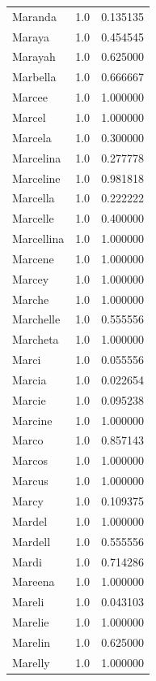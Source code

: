 \documentclass[
  letterpaper,
  DIV=11,
  numbers=noendperiod]{scrreprt}
\begin{document}
\begin{tabular}{lrr}
Maranda         &   1.0 &   0.135135 \\
Maraya          &   1.0 &   0.454545 \\
Marayah         &   1.0 &   0.625000 \\
Marbella        &   1.0 &   0.666667 \\
Marcee          &   1.0 &   1.000000 \\
Marcel          &   1.0 &   1.000000 \\
Marcela         &   1.0 &   0.300000 \\
Marcelina       &   1.0 &   0.277778 \\
Marceline       &   1.0 &   0.981818 \\
Marcella        &   1.0 &   0.222222 \\
Marcelle        &   1.0 &   0.400000 \\
Marcellina      &   1.0 &   1.000000 \\
Marcene         &   1.0 &   1.000000 \\
Marcey          &   1.0 &   1.000000 \\
Marche          &   1.0 &   1.000000 \\
Marchelle       &   1.0 &   0.555556 \\
Marcheta        &   1.0 &   1.000000 \\
Marci           &   1.0 &   0.055556 \\
Marcia          &   1.0 &   0.022654 \\
Marcie          &   1.0 &   0.095238 \\
Marcine         &   1.0 &   1.000000 \\
Marco           &   1.0 &   0.857143 \\
Marcos          &   1.0 &   1.000000 \\
Marcus          &   1.0 &   1.000000 \\
Marcy           &   1.0 &   0.109375 \\
Mardel          &   1.0 &   1.000000 \\
Mardell         &   1.0 &   0.555556 \\
Mardi           &   1.0 &   0.714286 \\
Mareena         &   1.0 &   1.000000 \\
Mareli          &   1.0 &   0.043103 \\
Marelie         &   1.0 &   1.000000 \\
Marelin         &   1.0 &   0.625000 \\
Marelly         &   1.0 &   1.000000 \\

\end{tabular}
\end{document}
